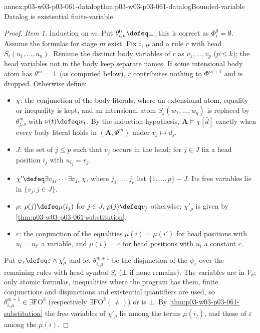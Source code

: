 \begin{annexitem}{annex:p03-w03-p03-061-datalog}{thm:p03-w03-p03-061-datalog}{Bounded-variable Datalog is existential finite-variable}
\begin{proof}
\emph{Item 1.} Induction on \(m\). Put \(\theta^0_{i,\mu}\defeq\bot\); this is
correct as \(\Phi^0_i=\emptyset\). Assume the formulas for stage \(m\) exist.
Fix \(i\), \(\mu\) and a rule \(r\) with head \(S_i(u_1,\ldots,u_n)\). Rename
the distinct body variables of \(r\) as \(v_1,\ldots,v_p\) (\(p\le k\)); the
head variables not in the body keep separate names. If some intensional body
atom has \(\theta^m=\bot\) (as computed below), \(r\) contributes nothing to
\(\Phi^{m+1}\) and is dropped. Otherwise define:
\begin{itemize}
\item \(\chi\): the conjunction of the body literals, where an extensional
      atom, equality or inequality is kept, and an intensional atom
      \(S_j(w_1,\ldots,w_q)\) is replaced by \(\theta^m_{j,\nu}\) with
      \(\nu(t)\defeq w_t\). By the induction hypothesis,
      \(\mathbf A\models\chi[\bar d]\) exactly when every body literal holds
      in \((\mathbf A,\Phi^m)\) under \(v_j\mapsto d_j\).
\item \(J\): the set of \(j\le p\) such that \(v_j\) occurs in the head; for
      \(j\in J\) fix a head position \(i_j\) with \(u_{i_j}=v_j\).
\item \(\chi'\defeq\exists v_{j_1}\cdots\exists v_{j_e}\,\chi\), where
      \(j_1,\ldots,j_e\) list \(\{1,\ldots,p\}-J\). Its free variables lie
      in \(\{v_j:j\in J\}\).
\item \(\rho\): \(\rho(j)\defeq\mu(i_j)\) for \(j\in J\), \(\rho(j)\defeq
      v_j\) otherwise; \(\chi'_\rho\) is given by
      \cref{thm:p03-w03-p03-061-substitution}.
\item \(\varepsilon\): the conjunction of the equalities
      \(\mu(i)=\mu(i')\) for head positions with \(u_i=u_{i'}\) a variable,
      and \(\mu(i)=c\) for head positions with \(u_i\) a constant \(c\).
\end{itemize}
Put \(\psi_{r}\defeq\varepsilon\wedge\chi'_\rho\) and let
\(\theta^{m+1}_{i,\mu}\) be the disjunction of the \(\psi_r\) over the
remaining rules with head symbol \(S_i\) (\(\bot\) if none remains). The
variables are in \(V_k\); only atomic formulas, inequalities where the
program has them, finite conjunctions and disjunctions and existential
quantifiers are used, so \(\theta^{m+1}_{i,\mu}\in\exists\mathrm{FO}^k\)
(respectively \(\exists\mathrm{FO}^k(\neq)\)) or is \(\bot\). By
\cref{thm:p03-w03-p03-061-substitution} the free variables of
\(\chi'_\rho\) lie among the terms \(\mu(i_j)\), and those of
\(\varepsilon\) among the \(\mu(i)\).


\end{proof}
\end{annexitem}
